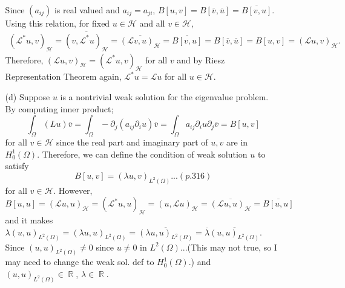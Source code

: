 \documentclass{article}
\DeclareMathOperator{\rr}{\mathbb{R}}
\begin{document}
\begin{enumerate}
\begin{enumerate}
Since $(a_{ij})$ is real valued and $a_{ij}=a_{ji}$, $B[u,v]=B[\overline{v},\overline{u}]=\overline{B[v,u]}$. Using this relation, for fixed $u\in\mathcal{H}$ and all $v\in \mathcal{H}$,
\begin{equation*}
\begin{split}
(\mathcal{L}^*u, v)_{\mathcal{H}}=\overline{(v,\mathcal{L}^*u)_{\mathcal{H}}}=\overline{(\mathcal{L}v,u)_{\mathcal{H}}}=\overline{B[v,u]}=B[\overline{v},\overline{u}] =B[u,v] =(\mathcal{L}u,v)_{\mathcal{H}}.
\end{split}
\end{equation*}
Therefore, $(\mathcal{L}u,v)_{\mathcal{H}}=(\mathcal{L}^*u,v)_{\mathcal{H}}$ for all $v$ and by Riesz Representation Theorem again, $\mathcal{L}^*u=\mathcal{L}u$ for all $u\in \mathcal{H}$.
\item[(d)] Suppose $u$ is a nontrivial weak solution for the eigenvalue problem. By computing inner product;
\begin{equation*}
\int_\Omega (Lu)\overline{v}=\int_\Omega -\partial_j(a_{ij}\partial_i u)\overline{v}=\int_\Omega a_{ij}\partial_i u\partial_j \overline{v}=B[u,v]
\end{equation*}
for all $v\in \mathcal{H}$ since the real part and imaginary part of $u,v$ are in $H^1_0(\Omega)$. Therefore, we can define the condition of weak solution $u$ to satisfy
\begin{equation*}
B[u,v]=(\lambda u,v)_{L^2(\Omega)}...(p.316)
\end{equation*}
for all $v\in\mathcal{H}$. However,
\begin{equation*}
B[u,u]=(\mathcal{L}u,u)_{\mathcal{H}}=(\mathcal{L}^*u,u)_{\mathcal{H}}=(u,\mathcal{L}u)_{\mathcal{H}}=\overline{(\mathcal{L}u,u)_{\mathcal{H}}}=\overline{B[u,u]}
\end{equation*}
and it makes $\lambda(u,u)_{L^2(\Omega)}=(\lambda u,u)_{L^2(\Omega)}=\overline{(\lambda u,u)_{L^2(\Omega)}}=\overline{\lambda}\overline{(u,u)_{L^2(\Omega)}}$. Since $(u,u)_{L^2(\Omega)}\neq 0$ since $u\neq 0$ in $L^2(\Omega)$...(This may not true, so I may need to change the weak sol. def to $H^1_0(\Omega)$.) and $(u,u)_{L^2(\Omega)}\in \rr$, $\lambda\in \rr$.
\end{enumerate}
\end{enumerate}
\end{document}

